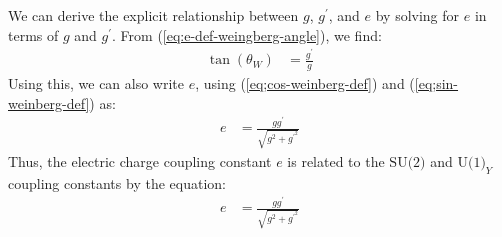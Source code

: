 We can derive the explicit relationship between $g$, $g^\prime $, and $e$ by solving for $e$ in terms of $g$ and $g^\prime $. From (\ref{eq:e-def-weingberg-angle}), we find:
\begin{align}
    \tan(\theta_W) &= \frac{g^\prime }{g}
\end{align}
Using this, we can also write $e$, using (\ref{eq;cos-weinberg-def}) and (\ref{eq;sin-weinberg-def}) as:
\begin{align}
    e &= \frac{g g^\prime }{\sqrt{g^2 + g^\prime ^2}}
\end{align}
Thus, the electric charge coupling constant $e$ is related to the $\text{SU(2)}$ and $\text{U(1)}_Y$ coupling constants by the equation:
\begin{align}
    e &= \frac{g g^\prime }{\sqrt{g^2 + g^\prime ^2}}
\end{align}
\bigskip\bigskip\hline\hline\bigskip
